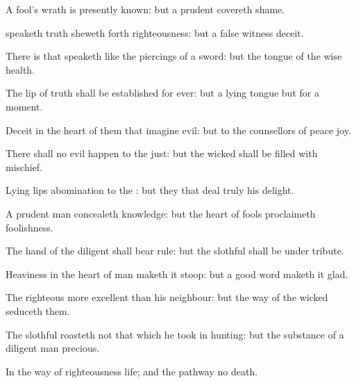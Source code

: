 {A
fool’s
wrath is
presently
known: but a
prudent
{}
covereth
shame.

speaketh
truth sheweth
forth
righteousness: but a
false
witness
deceit.

There
is that
speaketh like the
piercings of a
sword: but the
tongue of the
wise
{}
health.

The
lip of
truth shall be
established for
ever: but a
lying
tongue
{} but for a
moment.

Deceit
{} in the
heart of them that
imagine
evil: but to the
counsellors of
peace
{}
joy.

There shall no
evil
happen to the
just: but the
wicked shall be
filled with
mischief.

Lying
lips
{}
abomination to the
{}: but they that
deal
truly
{} his
delight.

A
prudent
man
concealeth
knowledge: but the
heart of
fools
proclaimeth
foolishness.

The
hand of the
diligent shall bear
rule: but the
slothful shall be under
tribute.

Heaviness in the
heart of
man maketh it
stoop: but a
good
word maketh it
glad.

The
righteous
{} more
excellent than his
neighbour: but the
way of the
wicked
seduceth them.

The
slothful
{}
roasteth not that which he took in
hunting: but the
substance of a
diligent
man
{}
precious.

In the
way of
righteousness
{}
life; and
{} the
pathway
{} no
death.




\par }
